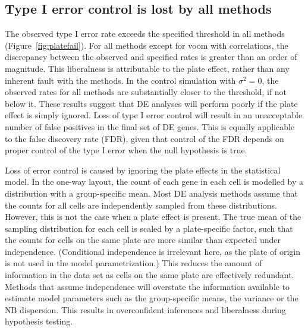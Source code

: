 \documentclass[oupdraft]{bio}
\begin{document}

\subsection{Type I error control is lost by all methods}
The observed type I error rate exceeds the specified threshold in all methods (Figure~\ref{fig:platefail}).
For all methods except for voom with correlations, the discrepancy between the observed and specified rates is greater than an order of magnitude.
This liberalness is attributable to the plate effect, rather than any inherent fault with the methods.
In the control simulation with $\sigma^2=0$, the observed rates for all methods are substantially closer to the threshold, if not below it.
These results suggest that DE analyses will perform poorly if the plate effect is simply ignored.
Loss of type I error control will result in an unacceptable number of false positives in the final set of DE genes.
This is equally applicable to the false discovery rate (FDR), given that control of the FDR depends on proper control of the type I error when the null hypothesis is true.

Loss of error control is caused by ignoring the plate effects in the statistical model.
In the one-way layout, the count of each gene in each cell is modelled by a distribution with a group-specific mean.
Most DE analysis methods assume that the counts for all cells are independently sampled from these distributions.
However, this is not the case when a plate effect is present.
The true mean of the sampling distribution for each cell is scaled by a plate-specific factor, 
    such that the counts for cells on the same plate are more similar than expected under independence.
(Conditional independence is irrelevant here, as the plate of origin is not used in the model parametrization.)
This reduces the amount of information in the data set as cells on the same plate are effectively redundant.
Methods that assume independence will overstate the information available to estimate model parameters such as the group-specific means, the variance or the NB dispersion.
This results in overconfident inferences and liberalness during hypothesis testing.
\end{document}
